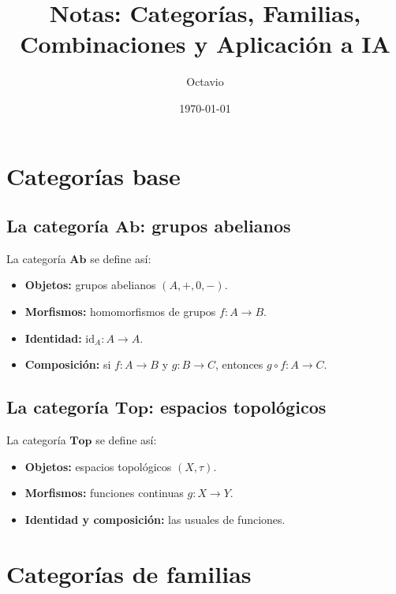 \documentclass[12pt,oneside]{book}
\theoremstyle{definition}
\begin{document}
\frontmatter
\title{Notas: Categorías, Familias, Combinaciones y Aplicación a IA}
\author{Octavio}
\date{\today}
\maketitle

\tableofcontents

\mainmatter

\chapter{Categorías base}
\label{chap:base}

\section{La categoría \texorpdfstring{$\mathbf{Ab}$}{Ab}: grupos abelianos}
La categoría $\mathbf{Ab}$ se define así:
\begin{itemize}[leftmargin=1.5em]
  \item \textbf{Objetos:} grupos abelianos $(A,+,0,-)$.
  \item \textbf{Morfismos:} homomorfismos de grupos $f:A\to B$.
  \item \textbf{Identidad:} $\mathrm{id}_A:A\to A$.
  \item \textbf{Composición:} si $f:A\to B$ y $g:B\to C$, entonces $g\circ f:A\to C$.
\end{itemize}

\section{La categoría \texorpdfstring{$\mathbf{Top}$}{Top}: espacios topológicos}
La categoría $\mathbf{Top}$ se define así:
\begin{itemize}[leftmargin=1.5em]
  \item \textbf{Objetos:} espacios topológicos $(X,\tau)$.
  \item \textbf{Morfismos:} funciones continuas $g:X\to Y$.
  \item \textbf{Identidad y composición:} las usuales de funciones.
\end{itemize}

\chapter{Categorías de familias}
\label{chap:familias}
\end{document}
